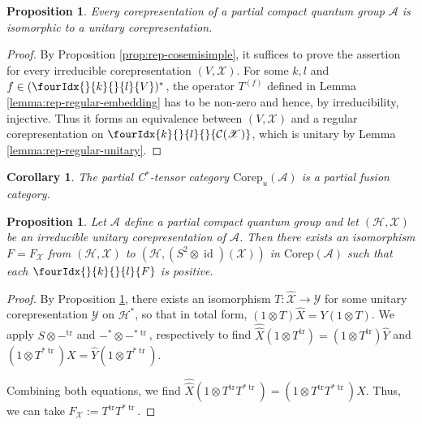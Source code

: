 \documentclass[10pt]{article}
\DeclareMathOperator{\id}{id}
\DeclareMathOperator{\tr}{\mathrm{tr}}
\newcommand{\dual}[1]{#1^{*}}
\newcommand{\dualop}[1]{#1^{\tr}}
\newcommand{\dualco}[1]{\hat{#1}}
\newcommand{\Corep}{\mathrm{Corep}}
\newcommand{\Hsp}{\mathcal{H}}
\newcommand{\Gr}[5]{\fourIdx{#2}{#4}{#3}{#5}{#1}}%
\newcommand{\Gru}[3]{\Gr{#1}{}{}{#2}{#3}}
\newcommand{\Grd}[3]{\Gr{#1}{#2}{#3}{}{}}
\newtheorem{Prop}[Theorem]{Proposition}
\newtheorem{Cor}[Theorem]{Corollary}
\theoremstyle{definition}
\numberwithin{equation}{section}
\begin{document}
\begin{Prop} \label{prop:rep-unitarisable} Every 
  corepresentation of a partial compact quantum group $\mathscr{A}$ is
  isomorphic to a unitary corepresentation.
\end{Prop}
\begin{proof}
  By Proposition \ref{prop:rep-cosemisimple}, it suffices to prove the
  assertion for every irreducible corepresentation $(V,\mathscr{X})$.  For some $k,l$ and $f \in
  \dual{(\Gru{V}{k}{l})}$, the operator $T^{(f)}$ defined in
  Lemma \ref{lemma:rep-regular-embedding} has to be non-zero and
  hence, by irreducibility, injective. Thus it forms an equivalence
  between $(V,\mathscr{X})$ and a regular
  corepresentation on $\Grd{\mathcal{C}(\mathscr{X})}{k}{l}$, which is
  unitary by Lemma \ref{lemma:rep-regular-unitary}.
\end{proof}
\begin{Cor} The partial C$^*$-tensor category $\Corep_u(\mathscr{A})$ is a partial fusion category.
\end{Cor}

\begin{Prop} \label{prop:rep-unitary-bidual}
  Let $\mathscr{A}$ define a partial compact quantum group and let
  $(\Hsp,\mathscr{X})$ be an irreducible unitary corepresentation of
  $\mathscr{A}$.  Then there exists an isomorphism $F=F_{\mathscr{X}}$
  from $(\Hsp,\mathscr{X})$ to 
  $(\Hsp,(S^{2} \otimes \id)(\mathscr{X}))$ in $\Corep(\mathscr{A})$ such
  that each $\Gru{F}{k}{l}$ is positive.
\end{Prop}
\begin{proof}
 By Proposition \ref{prop:rep-unitarisable}, there exists an
  isomorphism $T \colon \dualco{\mathscr{X}} \to \mathscr{Y}$ for some
  unitary corepresentation $\mathscr{Y}$ on $\dual{\Hsp}$, so that in total form,
  $(1\otimes T)\dualco{X} = Y(1 \otimes T)$.
We  apply   $S \otimes -^{\tr}$ and $-^{*} \otimes -^{*\tr}$,
respectively to find $ \dualco{\dualco{X}}(1 \otimes \dualop{T}) = (1 \otimes
  \dualop{T})\dualco{Y}$ and $(1 \otimes T^{*\tr})X=\dualco{Y}(1\otimes T^{*\tr}).$

Combining both equations, we
find $\dualco{\dualco{X}}(1 \otimes \dualop{T}T^{*\tr})=(1 \otimes
\dualop{T}T^{*\tr})X$. Thus, we can take
$F_{\mathscr{X}}:=\dualop{T}T^{*\tr}$.
\end{proof}
\end{document}

